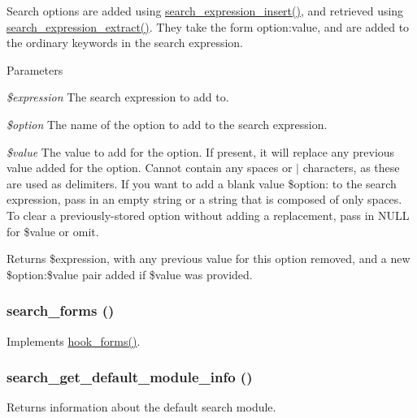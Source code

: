 Search options are added using \hyperlink{search_8module_a90b4fc5f716558dc1bf741c239fe1a0e}{search\_\-expression\_\-insert()}, and retrieved using \hyperlink{search_8module_a6d0e1560509bebe41ba4c6a2959ce59c}{search\_\-expression\_\-extract()}. They take the form option:value, and are added to the ordinary keywords in the search expression.


\begin{DoxyParams}{Parameters}
\item[{\em \$expression}]The search expression to add to. \item[{\em \$option}]The name of the option to add to the search expression. \item[{\em \$value}]The value to add for the option. If present, it will replace any previous value added for the option. Cannot contain any spaces or $|$ characters, as these are used as delimiters. If you want to add a blank value \$option: to the search expression, pass in an empty string or a string that is composed of only spaces. To clear a previously-\/stored option without adding a replacement, pass in NULL for \$value or omit.\end{DoxyParams}
\begin{DoxyReturn}{Returns}
\$expression, with any previous value for this option removed, and a new \$option:\$value pair added if \$value was provided. 
\end{DoxyReturn}
\hypertarget{search_8module_a3396c4111908648bd2d0ddff911449fa}{
\subsubsection[{search\_\-forms}]{\setlength{\rightskip}{0pt plus 5cm}search\_\-forms ()}}
\label{search_8module_a3396c4111908648bd2d0ddff911449fa}
Implements \hyperlink{group__hooks_gaa764fee74b85797f75c0c923cad628d5}{hook\_\-forms()}. \hypertarget{search_8module_abb3b45a6704ffdb16799bdd5e69a39ef}{
\subsubsection[{search\_\-get\_\-default\_\-module\_\-info}]{\setlength{\rightskip}{0pt plus 5cm}search\_\-get\_\-default\_\-module\_\-info ()}}
\label{search_8module_abb3b45a6704ffdb16799bdd5e69a39ef}
Returns information about the default search module.

